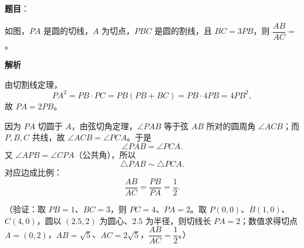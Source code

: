 \begin{answer}

\textbf{题目}：

如图，\(PA\) 是圆的切线，\(A\) 为切点，\(PBC\) 是圆的割线，且 \(BC=3PB\)，则 \(\dfrac{AB}{AC}=\)\gkblank{}。
\nopagebreak[4]
\begin{center}\end{center}
\nopagebreak[4]
\textbf{解析}

由切割线定理，
\nopagebreak[4]
\[
PA^2=PB\cdot PC=PB(PB+BC)=PB\cdot4PB=4PB^2,
\]
故 \(PA=2PB\)。

因为 \(PA\) 切圆于 \(A\)，由弦切角定理，\(\angle PAB\) 等于弦 \(AB\) 所对的圆周角 \(\angle ACB\)；而 \(P,B,C\) 共线，故 \(\angle ACB=\angle PCA\)。于是
\nopagebreak[4]
\[
\angle PAB=\angle PCA.
\]
又 \(\angle APB=\angle CPA\)（公共角），所以
\nopagebreak[4]
\[
\triangle PAB\sim\triangle PCA.
\]
对应边成比例：
\nopagebreak[4]
\[
\dfrac{AB}{AC}=\dfrac{PB}{PA}=\dfrac12.
\]

（验证：取 \(PB=1\)、\(BC=3\)，则 \(PC=4\)、\(PA=2\)。取 \(P(0,0)\)、\(B(1,0)\)、\(C(4,0)\)，圆以 \((2.5,2)\) 为圆心、\(2.5\) 为半径，则切线长 \(PA=2\)；数值求得切点 \(A=(0,2)\)，\(AB=\sqrt5\)、\(AC=2\sqrt5\)，\(\dfrac{AB}{AC}=\dfrac12\)。）


\end{answer}
